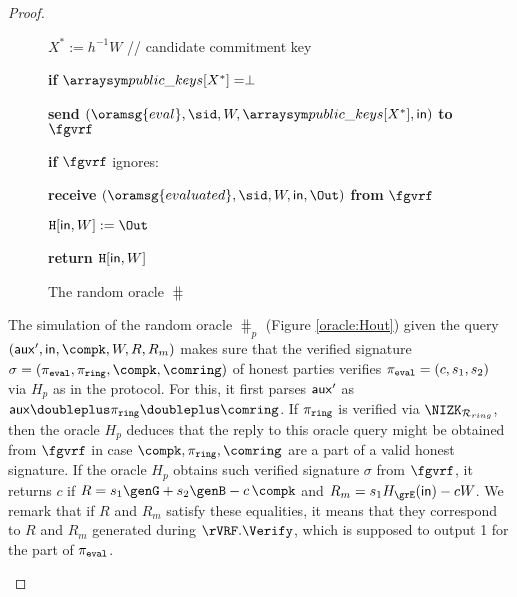 \begin{proof}
\begin{itemize}
\begin{figure}
\begin{minipage}{0.6\textwidth}
{{						{$ X^* := h^{-1}W $ // candidate commitment key} 
						
						
						{\textbf{if} $ \pkeys[X^*]  = \perp$}
						
						\tabdbl{$ \pk^* \leftsample \grE $} %
						
						\tabdbl{$ \pkeys[X^*] := \pk^* $}
						
						{\textbf{send} $ (\oramsg{eval}, \sid, W, \pkeys[X^*] , \msg) $ \textbf{to} $ \fgvrf $}
						
						{\textbf{if} $ \fgvrf $ ignores: }
						
						{\textbf{receive} $ (\oramsg{evaluated}, \sid, W, \msg, \Out) $ \textbf{from} $ \fgvrf $}
						
						{$ \mathtt{\hash}[\msg, W]:=\Out $}
						
%						
%						
						
						
						\textbf{return $ \mathtt{H}[\mathsf{in},  W] $}
						
				}}	
				\caption{The random oracle $ \hash $}
				\label{oracle:HnoPK}
			\end{minipage}
		\end{figure}
		


		The simulation of the random oracle $ \hash_p $ (Figure \ref{oracle:Hout}) given the query $ (\aux', \msg,\compk,W,R,R_m)  $ makes sure that the verified signature $ \sigma = (\pieval, \piring, \compk, \comring) $ of honest parties verifies $ \pi_{\mathtt{eval}} = (c, s_1,s_2) $ via $ H_p $ as in the protocol. For this, it first parses $ \mathsf{aux}' $ as $\tmpaux $.  If $ \pi_{\mathtt{ring}} $ is verified via $ \NIZK_{\mathcal{R}_{ring}} $, then the oracle $ H_p $ deduces that the reply to this oracle query might be obtained from $ \fgvrf $ in case $ \compk,\piring,\comring $ are  a part of a valid honest signature.
		 If the oracle $ H_p $ obtains such verified signature $ \sigma $ from $ \fgvrf $, it returns $ c $ if $ R = s_1 \genG + s_2 \genB - c \,\compk $ and $ R_m = s_1 \hashG(\msg) - cW $. We remark that if $ R $ and $ R_m $ satisfy these equalities, it means that they correspond to $ R $ and $ R_m $ generated during $ \rVRF.\Verify $, which is supposed to output 1  for the part of $ \pi_{\mathtt{eval}} $.
		 

\end{itemize}
\end{proof}
